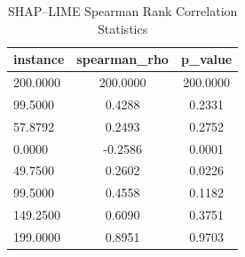 \begin{table}
\centering
\caption{SHAP–LIME Spearman Rank Correlation Statistics}
\label{tab:agreement}
\begin{tabular}{lcc}
\toprule
instance & spearman_rho & p_value \\
\midrule
200.0000 & 200.0000 & 200.0000 \\
99.5000 & 0.4288 & 0.2331 \\
57.8792 & 0.2493 & 0.2752 \\
0.0000 & -0.2586 & 0.0001 \\
49.7500 & 0.2602 & 0.0226 \\
99.5000 & 0.4558 & 0.1182 \\
149.2500 & 0.6090 & 0.3751 \\
199.0000 & 0.8951 & 0.9703 \\
\bottomrule
\end{tabular}
\end{table}
